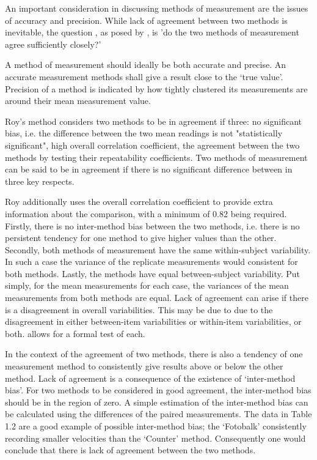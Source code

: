 \documentclass[Main.tex]{subfiles}
\begin{document}
	
	An important consideration in discussing methods of measurement are the issues of accuracy and precision.
	While lack of agreement between two methods is inevitable, the question , as
	posed by \citet{BA83}, is 'do the two methods of measurement agree
	sufficiently closely?'
	
	A method of measurement should ideally be both accurate and
	precise. An accurate measurement methods shall give a result close
	to the `true value'. Precision of a method is indicated by how
	tightly clustered its measurements are around their mean
	measurement value.	
	
	Roy's method considers two methods to be in agreement if three: no significant bias, i.e. the difference between the two mean readings is not "statistically significant", high overall correlation coefficient, the agreement between the two methods by testing their
	repeatability coefficients. Two methods of measurement can be said to be in agreement if there is no significant difference between in three key respects. 
	
	Roy additionally uses the overall correlation coefficient to provide extra information about the comparison, with a minimum of 0.82 being required. Firstly, there is no inter-method bias between the two methods, i.e. there is no persistent tendency for one method to give higher values than the other. Secondly, both methods of measurement have the same  within-subject variability. In such a case the variance of the replicate measurements would consistent for both methods. Lastly, the methods have equal between-subject variability.  Put simply, for the mean measurements for each case, the variances of the mean measurements from both methods are equal. Lack of agreement can arise if there is a disagreement in overall variabilities. This may be due to due to the disagreement in either between-item variabilities or within-item variabilities, or both. \citet{ARoy2009} allows for a formal test of each.
	
	
	
	
	
	
	In the context of the agreement of two methods, there is also a
	tendency of one measurement method to consistently give results
	above or below the other method. Lack of agreement is a
	consequence of the existence of `inter-method bias'. For two
	methods to be considered in good agreement, the inter-method bias
	should be in the region of zero. A simple estimation of the
	inter-method bias can be calculated using the differences of the
	paired measurements. The data in Table 1.2 are a good example of
	possible inter-method bias; the `Fotobalk' consistently recording
	smaller velocities than the `Counter' method. Consequently one
	would conclude that there is lack of agreement between the two
	methods.
	
\end{document}
